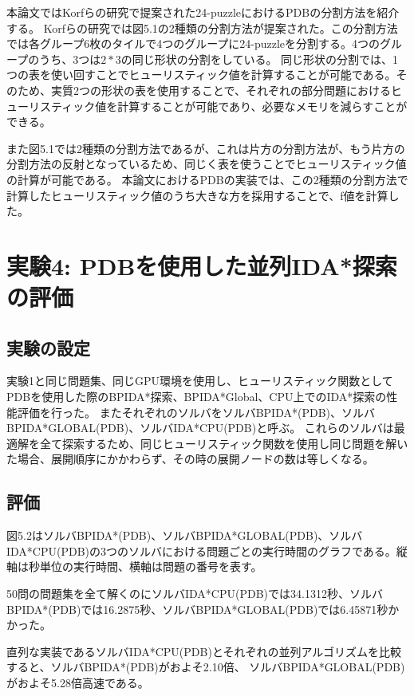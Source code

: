 \documentclass[a4paper,11pt,oneside,openany]{jsbook}
\begin{document}
本論文ではKorfらの研究\cite{KF02}で提案された24-puzzleにおけるPDBの分割方法を紹介する。
Korfらの研究\cite{KF02}では図5.1の2種類の分割方法が提案された。この分割方法では各グループ6枚のタイルで4つのグループに24-puzzleを分割する。4つのグループのうち、3つは$2*3$の同じ形状の分割をしている。
同じ形状の分割では、1つの表を使い回すことでヒューリスティック値を計算することが可能である。そのため、実質2つの形状の表を使用することで、それぞれの部分問題におけるヒューリスティック値を計算することが可能であり、必要なメモリを減らすことができる。

また図5.1では2種類の分割方法であるが、これは片方の分割方法が、もう片方の分割方法の反射となっているため、同じく表を使うことでヒューリスティック値の計算が可能である。
本論文におけるPDBの実装では、この2種類の分割方法で計算したヒューリスティック値のうち大きな方を採用することで、f値を計算した。




\section{実験4: PDBを使用した並列IDA*探索の評価}
\subsection{実験の設定}
実験1と同じ問題集、同じGPU環境を使用し、ヒューリスティック関数としてPDBを使用した際のBPIDA*探索、BPIDA*Global、CPU上でのIDA*探索の性能評価を行った。
またそれぞれのソルバをソルバBPIDA*(PDB)、ソルバBPIDA*GLOBAL(PDB)、ソルバIDA*CPU(PDB)と呼ぶ。
これらのソルバは最適解を全て探索するため、同じヒューリスティック関数を使用し同じ問題を解いた場合、展開順序にかかわらず、その時の展開ノードの数は等しくなる。

\subsection{評価}

図5.2はソルバBPIDA*(PDB)、ソルバBPIDA*GLOBAL(PDB)、ソルバIDA*CPU(PDB)の3つのソルバにおける問題ごとの実行時間のグラフである。縦軸は秒単位の実行時間、横軸は問題の番号を表す。

50問の問題集を全て解くのにソルバIDA*CPU(PDB)では34.1312秒、ソルバBPIDA*(PDB)では16.2875秒、ソルバBPIDA*GLOBAL(PDB)では6.45871秒かかった。

直列な実装であるソルバIDA*CPU(PDB)とそれぞれの並列アルゴリズムを比較すると、ソルバBPIDA*(PDB)がおよそ2.10倍、
ソルバBPIDA*GLOBAL(PDB)がおよそ5.28倍高速である。
\end{document}
